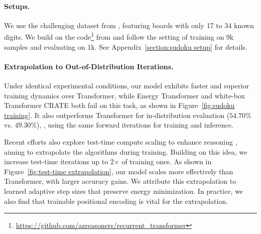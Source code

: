\paragraph{Setups.} We use the challenging dataset from \citet{palm2018recurrent}, featuring boards with only 17 to 34 known digits. We build on the code\footnote{\href{https://github.com/azreasoners/recurrent_transformer}{https://github.com/azreasoners/recurrent\_transformer}} from \citet{yang2023learning} and follow the setting of training on 9k samples and evaluating on 1k. See Appendix~\ref{section:sudoku setup} for details. 

\paragraph{Extrapolation to Out-of-Distribution Iterations.}
Under identical experimental conditions, our model exhibits faster and superior training dynamics over Transformer, while Energy Transformer \citep{hoover2024energy} and white-box Transformer \textsc{CRATE} \citep{yu2023white} both fail on this task, as shown in Figure~\ref{fig:sudoku training}. It also outperforms Transformer for in-distribution evaluation ($54.70\%$ vs. $49.30\%$), \ie, using the same forward iterations for training and inference. 

Recent efforts also explore test-time compute scaling to enhance reasoning \citep{schwarzschild2021can,bansal2022end,du2022learning,banino2021pondernet}, aiming to extrapolate the algorithms during training. Building on this idea, we increase test-time iterations up to 2$\times$ of training ones. As shown in Figure~\ref{fig:test-time extrapolation}, our model scales more effectively than Transformer, with larger accuracy gains. We attribute this extrapolation to learned adaptive step sizes that preserve energy minimization. In practice, we also find that trainable positional encoding is vital for the extrapolation. 

